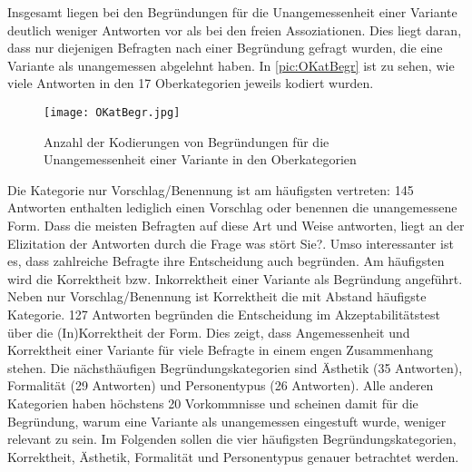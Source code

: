 Insgesamt liegen bei den Begründungen für die Unangemessenheit einer Variante deutlich weniger Antworten vor als bei den freien Assoziationen.
Dies liegt daran, dass nur diejenigen Befragten nach einer Begründung gefragt wurden, die eine Variante als unangemessen abgelehnt haben.  
In \autoref{pic:OKatBegr} ist zu sehen, wie viele Antworten in den 17 Oberkategorien jeweils kodiert wurden. 

\begin{figure}
\centering
\texttt{[image: OKatBegr.jpg]}
\caption{Anzahl der Kodierungen von Begründungen für die Unangemessenheit einer Variante in den Oberkategorien}
\label{pic:OKatBegr}
\end{figure}

Die Kategorie \glqq nur Vorschlag/Benennung\grqq{} ist am häufigsten vertreten:
145 Antworten enthalten lediglich einen Vorschlag oder benennen die unangemessene Form. 
Dass die meisten Befragten auf diese Art und Weise antworten, liegt an der Elizitation der Antworten durch die Frage \glqq was stört Sie?\grqq. 
Umso interessanter ist es, dass zahlreiche Befragte ihre Entscheidung auch begründen. 
Am häufigsten wird die Korrektheit bzw. Inkorrektheit einer Variante als Begründung angeführt. 
Neben \glqq nur Vorschlag/Benennung\grqq{} ist \glqq Korrektheit\grqq{} die mit Abstand häufigste Kategorie.  
127 Antworten begründen die Entscheidung im Akzeptabilitätstest über die (In)Korrektheit der Form. 
Dies zeigt, dass Angemessenheit und Korrektheit einer Variante für viele Befragte in einem engen Zusammenhang stehen. 
Die nächsthäufigen Begründungskategorien sind \glqq Ästhetik\grqq{} (35 Antworten), \glqq Formalität\grqq{} (29 Antworten) und \glqq Personentypus\grqq{} (26 Antworten). 
Alle anderen Kategorien haben höchstens 20 Vorkommnisse und scheinen damit für die Begründung, warum eine Variante als unangemessen eingestuft wurde, weniger relevant zu sein. 
Im Folgenden sollen die vier häufigsten Begründungskategorien, \glqq Korrektheit\grqq, \glqq Ästhetik\grqq, \glqq Formalität\grqq{} und \glqq Personentypus\grqq{} genauer betrachtet werden. 

